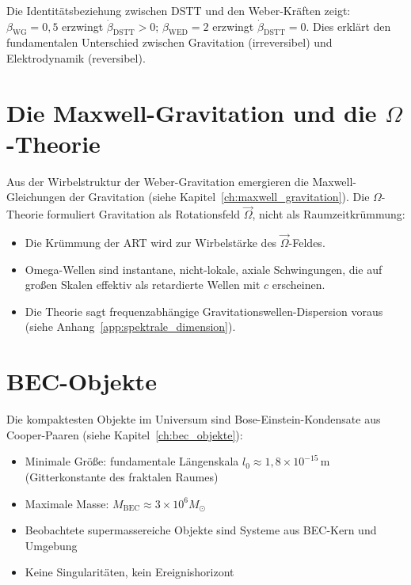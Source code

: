 Die Identitätsbeziehung zwischen DSTT und den Weber-Kräften zeigt: \( \beta_{\text{WG}} = 0,5 \) erzwingt \( \dot{\beta}_{\text{DSTT}} > 0 \); \( \beta_{\text{WED}} = 2 \) erzwingt \( \dot{\beta}_{\text{DSTT}} = 0 \). Dies erklärt den fundamentalen Unterschied zwischen Gravitation (irreversibel) und Elektrodynamik (reversibel).

\section{Die Maxwell-Gravitation und die \( \Omega \)-Theorie}
\label{sec:maxwell_omega_zf}

Aus der Wirbelstruktur der Weber-Gravitation emergieren die Maxwell-Gleichungen der Gravitation (siehe Kapitel~\ref{ch:maxwell_gravitation}). Die \( \Omega \)-Theorie formuliert Gravitation als Rotationsfeld \( \vec{\Omega} \), nicht als Raumzeitkrümmung:

\begin{itemize}
    \item Die Krümmung der ART wird zur Wirbelstärke des \( \vec{\Omega} \)-Feldes.
    \item Omega-Wellen sind instantane, nicht-lokale, axiale Schwingungen, die auf großen Skalen effektiv als retardierte Wellen mit \( c \) erscheinen.
    \item Die Theorie sagt frequenzabhängige Gravitationswellen-Dispersion voraus (siehe Anhang~\ref{app:spektrale_dimension}).
\end{itemize}

\section{BEC-Objekte}
\label{sec:bec_zf}

Die kompaktesten Objekte im Universum sind Bose-Einstein-Kondensate aus Cooper-Paaren (siehe Kapitel~\ref{ch:bec_objekte}):

\begin{itemize}
    \item Minimale Größe: fundamentale Längenskala \( l_0 \approx 1,8 \times 10^{-15} \, \text{m} \) (Gitterkonstante des fraktalen Raumes)
    \item Maximale Masse: \( M_{\text{BEC}} \approx 3 \times 10^6 M_\odot \)
    \item Beobachtete supermassereiche Objekte sind Systeme aus BEC-Kern und Umgebung
    \item Keine Singularitäten, kein Ereignishorizont
\end{itemize}

